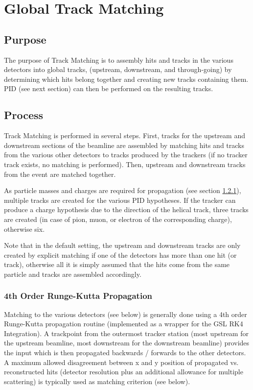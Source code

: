 \chapter{Global Track Matching}
\label{chapter:globaltrackmatching}

\section{Purpose}\label{sec:tmpurpose}

The purpose of Track Matching is to assembly hits and tracks in the various detectors into global tracks,
(upstream, downstream, and through-going) by determining which hits belong together and creating new tracks
containing them. PID (see next section) can then be performed on the resulting tracks.

\section{Process}\label{sec:tmprocess}

Track Matching is performed in several steps. First, tracks for the upstream and downstream sections of the
beamline are assembled by matching hits and tracks from the various other detectors to tracks produced by the
trackers (if no tracker track exists, no matching is performed). Then, upstream and downstream tracks from the
event are matched together.

As particle masses and charges are required for propagation (see section \ref{subsec:tmrk4}), multiple tracks
are created for the various PID hypotheses. If the tracker can produce a charge hypothesis due to the direction
of the helical track, three tracks are created (in case of pion, muon, or electron of the corresponding charge),
otherwise six.

Note that in the default setting, the upstream and downstream tracks are only created by explicit matching if
one of the detectors has more than one hit (or track), otherwise all it is simply assumed that the hits come from
the same particle and tracks are assembled accordingly.

\subsection{4th Order Runge-Kutta Propagation}\label{subsec:tmrk4}

Matching to the various detectors (see below) is generally done using a 4th order Runge-Kutta propagation routine
(implemented as a wrapper for the GSL RK4 Integration). A trackpoint from the outermost tracker station (most
upstream for the upstream beamline, most downstream for the downstream beamline) provides the input which is then
propagated backwards / forwards to the other detectors. A maximum allowed disagreement between x and y position of
propagated vs. reconstructed hits (detector resolution plus an additional allowance for multiple scattering) is
typically used as matching criterion (see below).

